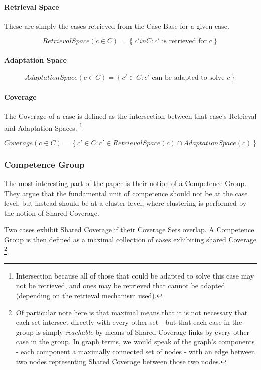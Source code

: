 \documentclass[a4paper,11pt]{report}
\begin{document}
\paragraph{Retrieval Space}

These are simply the cases retrieved from the Case Base for a given case.

\[ RetrievalSpace(c \in C) = \left\{ c' in C : c' \text{ is retrieved for c} \right\} \]

\paragraph{Adaptation Space}

\[ AdaptationSpace(c \in C) = \left\{ c' \in C : c' \text{ can be adapted to solve } c \right\} \]

\paragraph{Coverage}

The Coverage of a case is defined as the intersection between that case's Retrieval and Adaptation Spaces. \footnote{Intersection because all of those that could be adapted to solve this case may not be retrieved, and ones may be retrieved that cannot be adapted (depending on the retrieval mechanism used).}

\[ Coverage(c \in C) = \left\{ c' \in C : c' \in RetrievalSpace(c) \cap AdaptationSpace(c) \right\} \]


\subsubsection{Competence Group}
The most interesting part of the paper is their notion of a Competence Group. They argue that the fundamental unit of competence should not be at the case level, but instead should be at a cluster level, where clustering is performed by the notion of Shared Coverage.

Two cases exhibit Shared Coverage if their Coverage Sets overlap. A Competence Group is then defined as a maximal  collection  of  cases  exhibiting  shared Coverage \footnote{Of particular note here is that maximal means that it is not necessary that each set intersect directly with every other set - but that each case in the group is simply \emph{reachable} by means of Shared Coverage links by every other case in the group. In graph terms, we would speak of the graph's components - each component a maximally connected set of nodes - with an edge between two nodes representing Shared Coverage between those two nodes.}.
\end{document}
